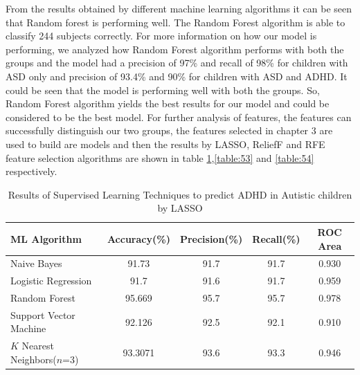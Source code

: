 From the results obtained by different machine learning algorithms it can be seen that Random forest is performing well. The Random Forest algorithm is able to classify 244 subjects correctly. For more information on how our model is performing, we analyzed how Random Forest algorithm performs with both the groups and the model had a precision of 97\% and recall of 98\% for children with ASD only and precision of 93.4\% and 90\% for children with ASD and ADHD. It could be seen that the model is performing well with both the groups. So, Random Forest algorithm yields the best results for our model and could be considered to be the best model. For further analysis of features, the features can successfully distinguish our two groups, the features selected in chapter 3 are used to build are models and then the results by LASSO, ReliefF  and RFE feature selection algorithms are shown in table \ref{table:52},\ref{table:53} and \ref{table:54} respectively.
\begin{table}[h]
\begin{center}
\begin{tabular}{|l|c|c|c|c|}
\hline
\textbf{ML Algorithm} & \textbf{Accuracy(\%)}&	\textbf{Precision(\%)}&	\textbf{Recall(\%)}&	\textbf{ROC Area}\\
\hline \hline
Naive Bayes	&91.73&	91.7&	91.7&	0.930\\
\hline
Logistic Regression&	91.7&	91.6&	91.7&	0.959\\
\hline
Random Forest&	95.669&	95.7&	95.7&	0.978\\
\hline
Support Vector Machine&	92.126&	92.5&	92.1&	0.910\\
\hline
$K$ Nearest Neighbors($n$=3)&	93.3071&	93.6&	93.3&	0.946\\
\hline
\end{tabular}
\end{center}
\caption{Results of Supervised Learning Techniques to predict ADHD in Autistic children by LASSO}
\label{table:52}
\end{table}

